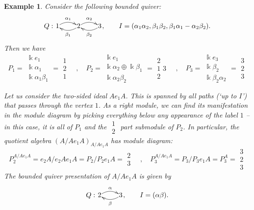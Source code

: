 \documentclass[11pt,a4paper]{article}
\numberwithin{equation}{section}
\theoremstyle{all}
\newtheorem{example}[theorem]{Example}
\theoremstyle{remark}
\begin{document}
\begin{example}
Consider the following bounded quiver:
\[
Q: \xymatrix@1{ 1 \ar@/^/[r]^{\alpha_1} & 2 \ar@/^/[r]^{\alpha_2}\ar@/^/[l]^{\beta_1} & 3 \ar@/^/[l]^{\beta_2} },  \qquad I=(\alpha_1\alpha_2, \beta_1\beta_2, \beta_1\alpha_1-\alpha_2\beta_2).
\]
Then we have
\[
P_1 = \begin{smallmatrix}
\Bbbk e_1\\\Bbbk \alpha_1\\ \Bbbk \alpha_1\beta_1
\end{smallmatrix} = \begin{smallmatrix}
1 \\ 2 \\ 1
\end{smallmatrix} \quad,\quad 
P_2 = \begin{smallmatrix}
\Bbbk e_1\\\Bbbk \alpha_2 \oplus\Bbbk \beta_1\\ \Bbbk \alpha_2\beta_2
\end{smallmatrix} = \begin{smallmatrix}
2 \\ 1 \,\, 3 \\ 2
\end{smallmatrix} \quad,\quad 
P_3 = \begin{smallmatrix}
\Bbbk e_3\\\Bbbk \beta_2\\ \Bbbk \beta_2\alpha_2
\end{smallmatrix} = \begin{smallmatrix}
3 \\ 2 \\ 3
\end{smallmatrix}
\]

Let us consider the two-sided ideal $Ae_1A$.
This is spanned by all paths (`up to $I$') that passes through the vertex $1$.
As a right module, we can find its manifestation in the module diagram by picking everything below any appearance of the label $1$ -- in this case, it is all of $P_1$ and the $\begin{smallmatrix}1\\2\end{smallmatrix}$ part submodule of $P_2$.
In particular, the quotient algebra $(A/Ae_1A)_{A/Ae_1A}$ has module diagram:
\[
P_2^{A/Ae_1A} = e_2A/e_2Ae_1A = P_2/P_2e_1A = \begin{smallmatrix}
2 \\ 3 \end{smallmatrix} \quad,\quad 
P_3^{A/Ae_1A} = P_3/P_3e_1A = P_3^A = \begin{smallmatrix}
3 \\ 2 \\ 3
\end{smallmatrix}
\]
The bounded quiver presentation of $A/Ae_1A$ is given by 
\[
Q: \xymatrix@1{ 2 \ar@/^/[r]^{\alpha} & 3 \ar@/^/[l]^{\beta} },  \qquad I=(\alpha\beta).
\]


\end{example}
\end{document}
